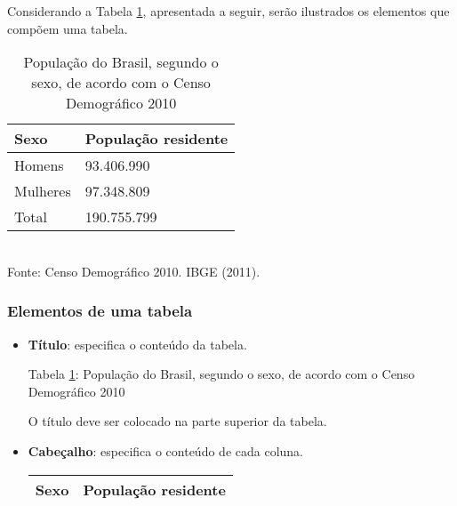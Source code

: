 \documentclass[11pt,fleqn]{book} %
\begin{document}
\begin{example} \label{exemp:elementosTabela}

	Considerando a Tabela \ref{tab:elementosdatabela}, apresentada a seguir, serão ilustrados os elementos que 
	compõem  uma tabela.

	\begin{table}[h]
	\caption{População do Brasil, segundo o sexo, de acordo com o Censo Demográfico 2010}
	\label{tab:elementosdatabela} 
	\vspace{0.1cm}
	\centering
	\begin{tabular}{l l}
	\toprule
	\textbf{Sexo} & \textbf{População residente}\\
	\midrule
	Homens & 93.406.990 \\
	Mulheres & 97.348.809 \\
	\hline
	Total & 190.755.799 \\
	\bottomrule
	\end{tabular} \\
	\vspace{0.1cm}\footnotesize Fonte: Censo Demográfico 2010. IBGE (2011).
	\end{table}

	
	\subsubsection{Elementos de uma tabela}
	
	\vspace{0.5cm}

	\begin{itemize}
	
	\item {\bf Título}: especifica o conteúdo da tabela.
	\begin{eBox} 
	Tabela \ref{tab:elementosdatabela}: População do Brasil, segundo o sexo, de acordo com o Censo 	
	Demográfico 2010  
	\end{eBox}
	
	O título deve ser colocado na parte superior da tabela.\\
	
	
	\item {\bf Cabeçalho}: especifica o conteúdo de cada coluna.
	\begin{eBox}
	\centering
	\begin{tabular}{l l}
	\toprule
	\textbf{Sexo} & \textbf{População residente}\\
	\midrule
	\end{tabular}
	\end{eBox}
	\hspace{0.5cm}	
	

\end{itemize}
\end{example}
\end{document}
